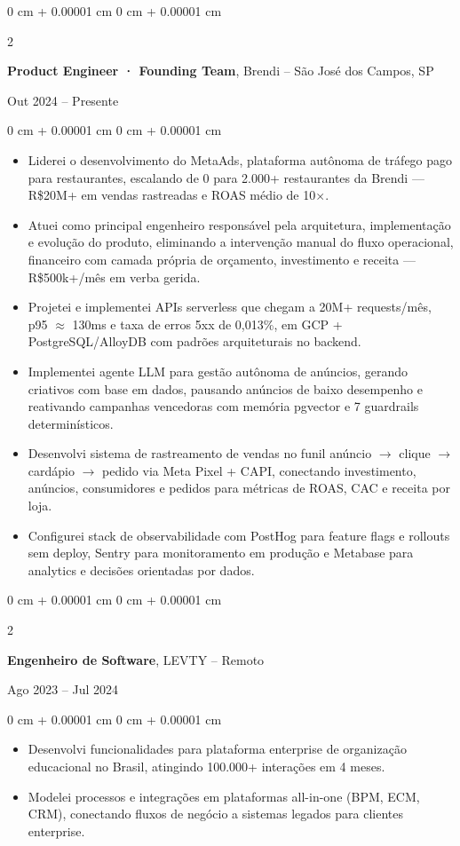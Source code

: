 \documentclass[10pt, a4paper]{article}
\newenvironment{highlights}{
    \begin{itemize}[
        topsep=0.05 cm,
        parsep=0.05 cm,
        partopsep=0pt,
        itemsep=0pt,
        leftmargin=0 cm + 10pt
    ]
}{
    \end{itemize}
}
\newenvironment{onecolentry}{
    \begin{adjustwidth}{
        0 cm + 0.00001 cm
    }{
        0 cm + 0.00001 cm
    }
}{
    \end{adjustwidth}
}
\newenvironment{twocolentry}[2][]{
    \onecolentry
    \def\secondColumn{#2}
    \setcolumnwidth{\fill, 4.5 cm}
    \begin{paracol}{2}
}{
    \switchcolumn \raggedleft \secondColumn
    \end{paracol}
    \endonecolentry
}
\begin{document}
    \begin{twocolentry}{Out 2024 -- Presente}
        \textbf{Product Engineer · Founding Team}, Brendi -- São José dos Campos, SP
    \end{twocolentry}
    \vspace{0.10 cm}
    \begin{onecolentry}
        \begin{highlights}
            \item Liderei o desenvolvimento do MetaAds, plataforma autônoma de tráfego pago para restaurantes, escalando de 0 para 2.000+ restaurantes da Brendi --- R\$20M+ em vendas rastreadas e ROAS médio de 10$\times$.
            \item Atuei como principal engenheiro responsável pela arquitetura, implementação e evolução do produto, eliminando a intervenção manual do fluxo operacional, financeiro com camada própria de orçamento, investimento e receita --- R\$500k+/mês em verba gerida.
            \item Projetei e implementei APIs serverless que chegam a 20M+ requests/mês, p95 $\approx$ 130ms e taxa de erros 5xx de 0,013\%, em GCP + PostgreSQL/AlloyDB com padrões arquiteturais no backend.
            \item Implementei agente LLM para gestão autônoma de anúncios, gerando criativos com base em dados, pausando anúncios de baixo desempenho e reativando campanhas vencedoras com memória pgvector e 7 guardrails determinísticos.
            \item Desenvolvi sistema de rastreamento de vendas no funil anúncio $\rightarrow$ clique $\rightarrow$ cardápio $\rightarrow$ pedido via Meta Pixel + CAPI, conectando investimento, anúncios, consumidores e pedidos para métricas de ROAS, CAC e receita por loja.
            \item Configurei stack de observabilidade com PostHog para feature flags e rollouts sem deploy, Sentry para monitoramento em produção e Metabase para analytics e decisões orientadas por dados.
        \end{highlights}
    \end{onecolentry}

    \vspace{0.18 cm}

    \begin{twocolentry}{Ago 2023 -- Jul 2024}
        \textbf{Engenheiro de Software}, LEVTY -- Remoto
    \end{twocolentry}
    \vspace{0.10 cm}
    \begin{onecolentry}
        \begin{highlights}
            \item Desenvolvi funcionalidades para plataforma enterprise de organização educacional no Brasil, atingindo 100.000+ interações em 4 meses.
            \item Modelei processos e integrações em plataformas all-in-one (BPM, ECM, CRM), conectando fluxos de negócio a sistemas legados para clientes enterprise.
        \end{highlights}
    \end{onecolentry}
\end{document}
